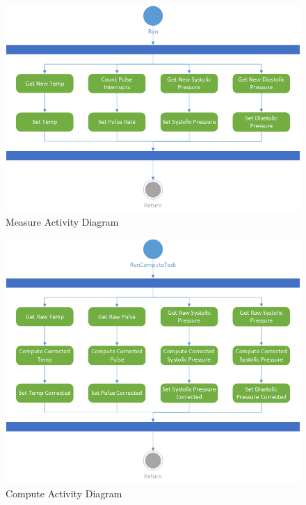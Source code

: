 \documentclass[12pt]{article} %
\begin{document}
    \begin{figure}
      \centering
      \includegraphics[width=\textwidth]{../design/measure_activity.png}
      \caption{Measure Activity Diagram}
      \label{fig:measureActivity}
    \end{figure}

    \begin{figure}
      \centering
      \includegraphics[width=\textwidth]{../design/compute_activity.png}
      \caption{Compute Activity Diagram}
      \label{fig:computeActivity}
    \end{figure}
\end{document}
